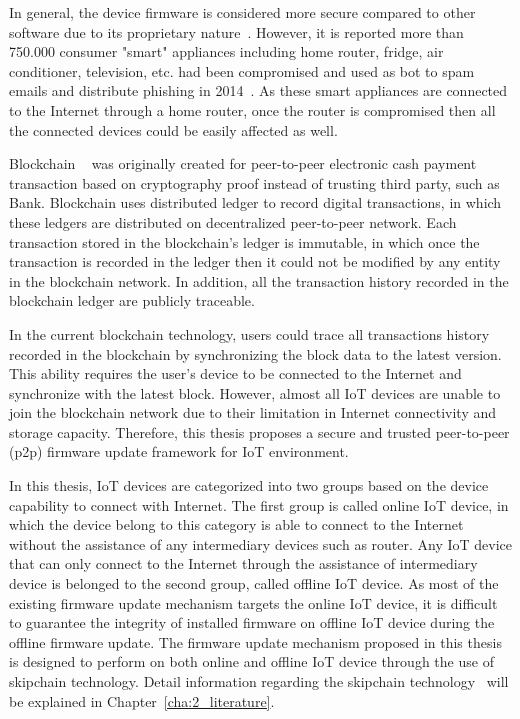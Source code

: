 In general, the device firmware is considered more secure compared to other software due to its proprietary nature~\cite{Byung16}. However, it is reported more than 750.000 consumer "smart" appliances including home router, fridge, air conditioner, television, etc. had been compromised and used as bot to spam emails and distribute phishing in 2014~\cite{ProofPoint14}. As these smart appliances are connected to the Internet through a home router, once the router is compromised then all the connected devices could be easily affected as well. 

Blockchain ~\cite{Satoshi} was originally created for peer-to-peer electronic cash payment transaction based on cryptography proof instead of trusting third party, such as Bank. Blockchain uses distributed ledger to record digital transactions, in which these ledgers are distributed on decentralized peer-to-peer network. Each transaction stored in the blockchain's ledger is immutable, in which once the transaction is recorded in the ledger then it could not be modified by any entity in the blockchain network. In addition, all the transaction history recorded in the blockchain ledger are publicly traceable. 

In the current blockchain technology, users could trace all transactions history recorded in the blockchain by synchronizing the block data to the latest version. This ability requires the user's device to be connected to the Internet and synchronize with the latest block. However, almost all IoT devices are unable to join the blockchain network due to their limitation in Internet connectivity and storage capacity. Therefore, this thesis proposes a secure and trusted peer-to-peer (p2p) firmware update framework for IoT environment.

In this thesis, IoT devices are categorized into two groups based on the device capability to connect with Internet. The first group is called online IoT device, in which the device belong to this category is able to connect to the Internet without the assistance of any intermediary devices such as router. Any IoT device that can only connect to the Internet through the assistance of intermediary device is belonged to the second group, called offline IoT device. As most of the existing firmware update mechanism targets the online IoT device, it is difficult to guarantee the integrity of installed firmware on offline IoT device during the offline firmware update. The firmware update mechanism proposed in this thesis is designed to perform on both online and offline IoT device through the use of skipchain technology. Detail information regarding the skipchain technology~\cite{Skipchain} will be explained in Chapter~\ref{cha:2_literature}.


